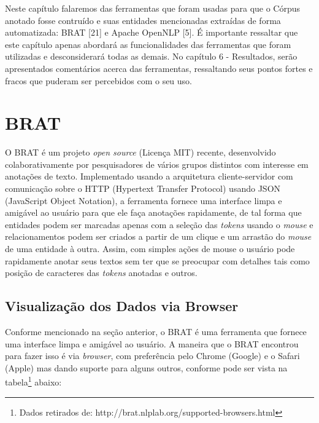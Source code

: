 \documentclass[11pt]{report}
\begin{document}
\indent\indent Neste capítulo falaremos das ferramentas que foram usadas para que o Córpus anotado fosse contruído e suas entidades mencionadas extraídas
de forma automatizada: BRAT [21] e Apache OpenNLP [5]. É importante ressaltar que este capítulo apenas abordará as funcionalidades das ferramentas que foram utilizadas e desconsiderará todas as
demais. No capítulo 6 - Resultados, serão apresentados comentários acerca das ferramentas, ressaltando seus pontos fortes e fracos que puderam ser percebidos com o  seu uso.

\section{BRAT}

\indent\indent O BRAT é um projeto \textit{open source} (Licença MIT) recente, desenvolvido colaborativamente por pesquisadores de vários grupos distintos com interesse em
anotações de texto. Implementado usando a arquitetura cliente-servidor com comunicação sobre o HTTP (Hypertext Transfer Protocol) usando JSON (JavaScript Object Notation), a
ferramenta fornece uma interface limpa e amigável ao usuário para que ele faça anotações rapidamente, de tal forma que
entidades podem ser marcadas apenas com a seleção das \textit{tokens} usando o \textit{mouse} e relacionamentos podem ser criados a partir de um clique e um arrastão do
\textit{mouse} de uma entidade à outra. Assim, com simples ações de mouse o usuário pode rapidamente anotar seus textos sem ter que se preocupar com detalhes tais como
posição de caracteres das \textit{tokens} anotadas e outros.

\subsection{Visualização dos Dados via Browser}

\indent\indent Conforme mencionado na seção anterior, o BRAT é uma ferramenta que fornece uma interface limpa e amigável ao usuário. A maneira que o BRAT encontrou para fazer isso
é via \textit{browser}, com preferência pelo Chrome (Google) e o Safari (Apple) mas dando suporte para alguns outros, conforme pode ser vista na
tabela\footnote[10]{Dados retirados de: http://brat.nlplab.org/supported-browsers.html} abaixo:
\end{document}
